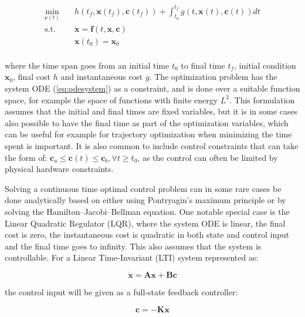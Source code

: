 \begin{equation}
    \begin{aligned}
        \min_{\bm{c}(t)} \quad & h(t_f, \bm{x}(t_f), \bm{c}(t_f)) + \int_{t_0}^{t_f} g(t, \bm{x}(t), \bm{c}(t)) dt \\
        \textrm{s.t.} \quad & \dot{\bm{x}} = \bm{f}(t, \bm{x}, \bm{c}) \\
        & \bm{x}(t_0) = \bm{x}_0 \\
    \end{aligned}
    \label{eq:continuousoptimalcontrol}
\end{equation}

\noindent where the time span goes from an initial time $t_0$ to final time $t_f$, initial condition $\bm{x}_0$, final cost $h$ and instantaneous cost $g$. The optimization problem has the system ODE (\ref{eq:odesystem}) as a constraint, and is done over a suitable function space, for example the space of functions with finite energy $L^2$. This formulation assumes that the initial and final times are fixed variables, but it is in some cases also possible to have the final time as part of the optimization variables, which can be useful for example for trajectory optimization when minimizing the time spent is important. It is also common to include control constraints that can take the form of: $\bm{c}_a \leq \bm{c}(t) \leq \bm{c}_b, \forall t \geq t_0$, as the control can often be limited by physical hardware constraints.

Solving a continuous time optimal control problem can in some rare cases be done analytically based on either using Pontryagin's maximum principle or by solving the Hamilton–Jacobi–Bellman equation. One notable special case is the Linear Quadratic Regulator (LQR), where the system ODE is linear, the final cost is zero, the instantaneous cost is quadratic in both state and control input and the final time goes to infinity. This also assumes that the system is controllable. For a Linear Time-Invariant (LTI) system represented as:

\begin{equation}
    \dot{\bm{x}} = \bm{A} \bm{x} + \bm{B} \bm{c}
\end{equation}

\noindent the control input will be given as a full-state feedback controller:

\begin{equation}
    \bm{c} = - \bm{K} \bm{x}
\end{equation}

